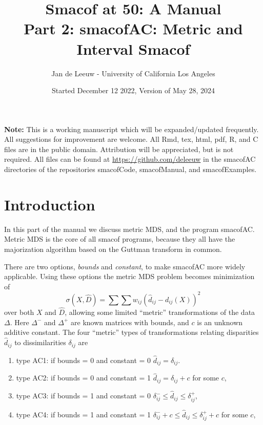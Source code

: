\documentclass[
  12pt,
]{article}
\title{Smacof at 50: A Manual\\
Part 2: smacofAC: Metric and Interval Smacof}
\author{Jan de Leeuw - University of California Los Angeles}
\date{Started December 12 2022, Version of May 28, 2024}
\providecommand{\tightlist}{%
  \setlength{\itemsep}{0pt}\setlength{\parskip}{0pt}}
\begin{document}
\maketitle

{
\setcounter{tocdepth}{3}
\tableofcontents
}
\textbf{Note:} This is a working manuscript which will be expanded/updated
frequently. All suggestions for improvement are welcome. All Rmd, tex,
html, pdf, R, and C files are in the public domain. Attribution will be
appreciated, but is not required. All files can be found at
\url{https://github.com/deleeuw} in the smacofAC directories of the repositories smacofCode, smacofManual, and smacofExamples.

\section{Introduction}\label{introduction}

In this part of the manual we discuss metric MDS, and the program
smacofAC. Metric MDS is the core of all smacof programs, because they
all have the majorization algorithm based on the Guttman transform
in common.

There are two options, \emph{bounds} and \emph{constant}, to make smacofAC more widely applicable. Using these options the metric MDS problem becomes minimization of
\begin{equation}
\sigma(X,\hat D)=\sum\sum w_{ij}(\hat d_{ij}-d_{ij}(X))^2
\label{eq:sdefac}
\end{equation}
over both \(X\) and \(\hat D\), allowing some limited ``metric'' transformations of the data \(\Delta\). Here \(\Delta^-\) and \(\Delta^+\) are known matrices with bounds, and \(c\) is an unknown additive constant. The four ``metric'' types of transformations
relating disparities \(\hat d_{ij}\) to dissimilarities \(\delta_{ij}\) are

\begin{enumerate}
\def\labelenumi{\arabic{enumi}.}
\tightlist
\item
  type AC1: if bounds = 0 and constant = 0 \(\hat d_{ij}=\delta_{ij}\).
\item
  type AC2: if bounds = 0 and constant = 1 \(\hat d_{ij}=\delta_{ij}+c\) for some \(c\),
\item
  type AC3: if bounds = 1 and constant = 0 \(\delta^-_{ij}\leq\hat d_{ij}\leq\delta^+_{ij}\),
\item
  type AC4: if bounds = 1 and constant = 1 \(\delta^-_{ij}+c\leq\hat d_{ij}\leq\delta^+_{ij}+c\) for some \(c\),
\end{enumerate}
\end{document}
